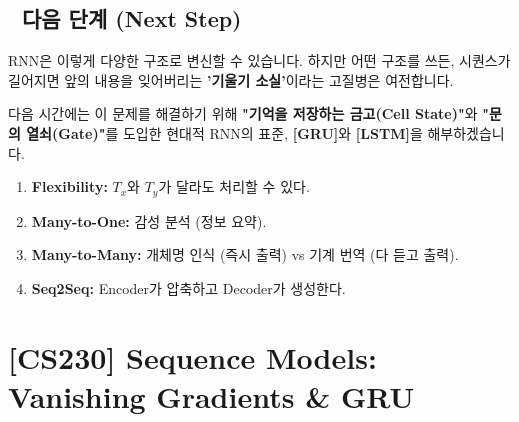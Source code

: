 \documentclass[11pt,a4paper]{book}
\theoremstyle{definition}
\begin{document}
\section*{🔗 다음 단계 (Next Step)}
RNN은 이렇게 다양한 구조로 변신할 수 있습니다. 하지만 어떤 구조를 쓰든, 시퀀스가 길어지면 앞의 내용을 잊어버리는 \textbf{'기울기 소실'}이라는 고질병은 여전합니다.

다음 시간에는 이 문제를 해결하기 위해 \textbf{"기억을 저장하는 금고(Cell State)"}와 \textbf{"문의 열쇠(Gate)"}를 도입한 현대적 RNN의 표준, \textbf{[GRU]}와 \textbf{[LSTM]}을 해부하겠습니다.

\vspace{0.5cm}

\begin{summarybox}[title={단원 요약 (Cheat Sheet)}]
\begin{enumerate}
    \item \textbf{Flexibility:} $T_x$와 $T_y$가 달라도 처리할 수 있다.
    \item \textbf{Many-to-One:} 감성 분석 (정보 요약).
    \item \textbf{Many-to-Many:} 개체명 인식 (즉시 출력) vs 기계 번역 (다 듣고 출력).
    \item \textbf{Seq2Seq:} Encoder가 압축하고 Decoder가 생성한다.
\end{enumerate}
\end{summarybox}


\chapter{[CS230] Sequence Models: \\ Vanishing Gradients \& GRU}
\label{ch:lecture41}

\end{document}
